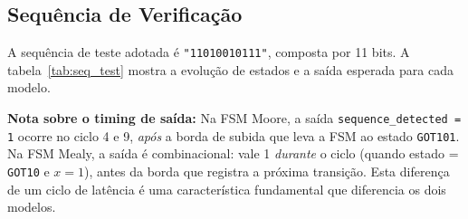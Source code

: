 \documentclass[12pt,a4paper]{article}
\begin{document}
\subsection{Sequência de Verificação}

A sequência de teste adotada é \texttt{"11010010111"}, composta por 11 bits.
A tabela~\ref{tab:seq_test} mostra a evolução de estados e a saída esperada
para cada modelo.

\begin{table}[H]
  \centering
  \caption{Evolução da sequência de teste \texttt{"11010010111"}}
  \label{tab:seq_test}
\end{table}

\noindent\textbf{Nota sobre o timing de saída:}
Na FSM Moore, a saída \texttt{sequence\_detected = 1} ocorre no ciclo 4 e 9,
\emph{após} a borda de subida que leva a FSM ao estado \texttt{GOT101}. Na FSM
Mealy, a saída é combinacional: vale 1 \emph{durante} o ciclo (quando estado =
\texttt{GOT10} e $x = 1$), antes da borda que registra a próxima transição.
Esta diferença de um ciclo de latência é uma característica fundamental que
diferencia os dois modelos.
\end{document}
